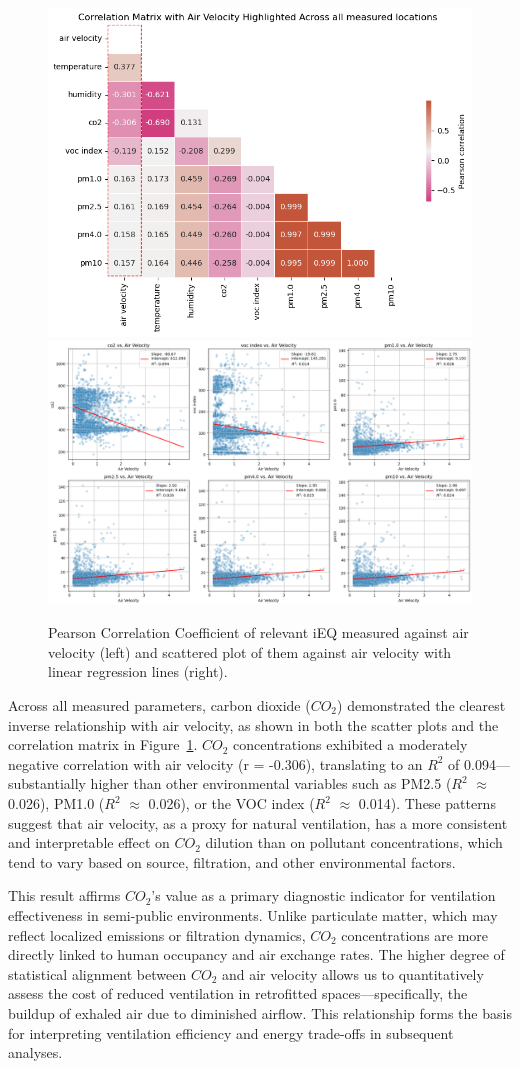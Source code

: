 \documentclass[preprint,12pt]{elsarticle}
\begin{document}
\begin{figure}[h!]
    \centering
    \includegraphics[width=0.45\linewidth]{img/aircorr.png}\includegraphics[width=0.55\linewidth]{img/co2scatter.png}
    \caption{Pearson Correlation Coefficient of relevant iEQ measured against air velocity (left) and scattered plot of them against air velocity with linear regression lines (right).}
    \label{fig:trianglescatter}
\end{figure}

Across all measured parameters, carbon dioxide ($CO_2$) demonstrated the clearest inverse relationship with air velocity, as shown in both the scatter plots and the correlation matrix in Figure~\ref{fig:trianglescatter}. $CO_2$ concentrations exhibited a moderately negative correlation with air velocity (r = -0.306), translating to an $R^2$ of 0.094—substantially higher than other environmental variables such as PM2.5 ($R^2$ $\approx$ 0.026), PM1.0 ($R^2$ $\approx $ 0.026), or the VOC index ($R^2$ $\approx$ 0.014). These patterns suggest that air velocity, as a proxy for natural ventilation, has a more consistent and interpretable effect on $CO_2$ dilution than on pollutant concentrations, which tend to vary based on source, filtration, and other environmental factors.

This result affirms $CO_2$’s value as a primary diagnostic indicator for ventilation effectiveness in semi-public environments. Unlike particulate matter, which may reflect localized emissions or filtration dynamics, $CO_2$ concentrations are more directly linked to human occupancy and air exchange rates. The higher degree of statistical alignment between $CO_2$ and air velocity allows us to quantitatively assess the cost of reduced ventilation in retrofitted spaces—specifically, the buildup of exhaled air due to diminished airflow. This relationship forms the basis for interpreting ventilation efficiency and energy trade-offs in subsequent analyses.
\end{document}
